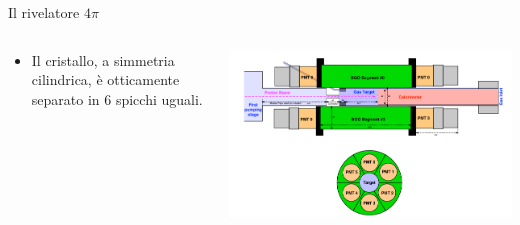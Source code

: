 \documentclass [xcolor=svgnames] {beamer}
\begin{document}
\begin{frame}{Il rivelatore $4\pi$}
	\begin{columns}
		\begin{column}{0.45\textwidth}
			\begin{itemize}%
				\item Il cristallo, a simmetria cilindrica, è otticamente separato in 6 spicchi uguali.
			\end{itemize}
		\end{column}
		\begin{column}{0.45\textwidth}
			\centering
			\includegraphics[width=\textwidth]{img/BGO.png}%
		\end{column}
	\end{columns}
\end{frame}


%		
%		
\end{document}

